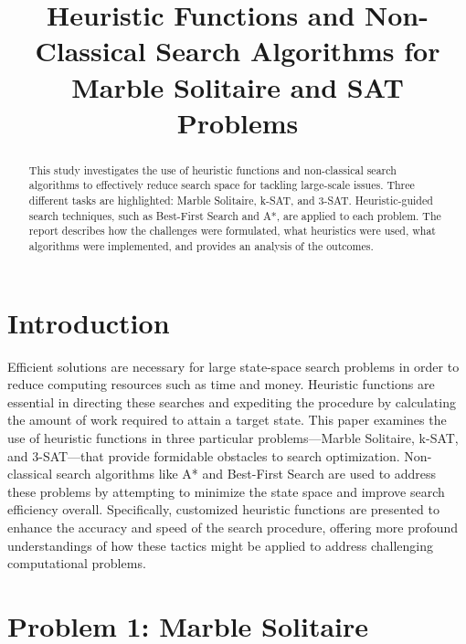 \documentclass[conference]{IEEEtran}
\begin{document}
\title{Heuristic Functions and Non-Classical Search Algorithms for Marble Solitaire and SAT Problems}

\author{
}

\maketitle

\begin{abstract}
This study investigates the use of heuristic functions and non-classical search algorithms to effectively reduce search space for tackling large-scale issues. Three different tasks are highlighted: Marble Solitaire, k-SAT, and 3-SAT. Heuristic-guided search techniques, such as Best-First Search and A*, are applied to each problem. The report describes how the challenges were formulated, what heuristics were used, what algorithms were implemented, and provides an analysis of the outcomes.
\end{abstract}

\section{Introduction}
Efficient solutions are necessary for large state-space search problems in order to reduce computing resources such as time and money. Heuristic functions are essential in directing these searches and expediting the procedure by calculating the amount of work required to attain a target state. This paper examines the use of heuristic functions in three particular problems—Marble Solitaire, k-SAT, and 3-SAT—that provide formidable obstacles to search optimization. Non-classical search algorithms like A* and Best-First Search are used to address these problems by attempting to minimize the state space and improve search efficiency overall. Specifically, customized heuristic functions are presented to enhance the accuracy and speed of the search procedure, offering more profound understandings of how these tactics might be applied to address challenging computational problems.

\section{Problem 1: Marble Solitaire}
\end{document}
